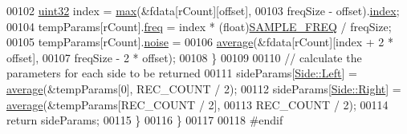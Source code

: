 \begin{DoxyCode}
00102             \hyperlink{definitions_8hpp_a1134b580f8da4de94ca6b1de4d37975e}{uint32} index = \hyperlink{namespacevaso_a122846d728be312454a452d379915e10}{max}(&fdata[rCount][offset],
00103                     freqSize - offset).\hyperlink{structMaximum_a2e6aef03795cd285fe542d0861c6e3b5}{index};
00104             tempParams[rCount].\hyperlink{structDataParams_a12566e017407647bc8287d62554ad3fb}{freq} = index * (float)\hyperlink{definitions_8hpp_a9401e43a8c86acafb31c8e2709baefa1}{SAMPLE\_FREQ} / freqSize;
00105             tempParams[rCount].\hyperlink{structDataParams_a4efd1d2231c6fa7c878c9d5e1650738f}{noise} =
00106                 \hyperlink{namespacevaso_ad3205136b1cd04b4c6b9d7be73661796}{average}(&fdata[rCount][index + 2 * offset],
00107                         freqSize - 2 * offset);
00108         \}
00109 
00110         \textcolor{comment}{// calculate the parameters for each side to be returned}
00111         sideParams[\hyperlink{namespacevaso_a77c5d9704657d49d456f691ddd8abf7ca945d5e233cf7d6240f6b783b36a374ff}{Side::Left}] = \hyperlink{namespacevaso_ad3205136b1cd04b4c6b9d7be73661796}{average}(&tempParams[0], REC\_COUNT / 2);
00112         sideParams[\hyperlink{namespacevaso_a77c5d9704657d49d456f691ddd8abf7ca92b09c7c48c520c3c55e497875da437c}{Side::Right}] = \hyperlink{namespacevaso_ad3205136b1cd04b4c6b9d7be73661796}{average}(&tempParams[REC\_COUNT / 2],
00113                 REC\_COUNT / 2);
00114         \textcolor{keywordflow}{return} sideParams;
00115     \}
00116 \}
00117 
00118 \textcolor{preprocessor}{#endif}
\end{DoxyCode}
